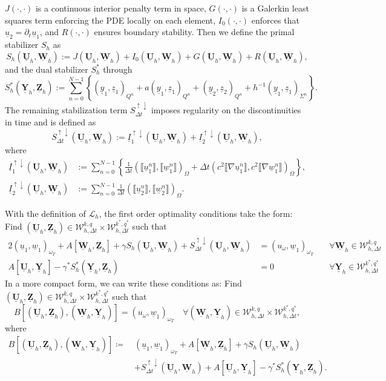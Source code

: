 \documentclass[sn-mathphys-num]{sn-jnl}
\numberwithin{equation}{section}
\newcommand{\jump}[1]{\llbracket#1\rrbracket}
\newcommand{\cL}{\mathcal{L}}
\newcommand{\ProdFullyDiscrSpace}[2]{ \mathcal{W}^{ {#1},{#2}}_{h, \Delta t  } }
\newcommand{\Uh}{\underline{\mathbf{U}}_h}
\newcommand{\Yh}{\underline{\mathbf{Y}}_h}
\newcommand{\Zh}{\underline{\mathbf{Z}}_h}
\newcommand{\Wh}{\underline{\mathbf{W}}_h}
\newcommand{\ul}{\underline{u}}
\newcommand{\yl}{\underline{y}}
\newcommand{\zl}{\underline{z}}
\newcommand{\wl}{\underline{w}}
\newcommand{\Sud}{S^{\uparrow \downarrow}_{\Delta t}}
\newcommand{\dt}{\partial_t}
\begin{document}
$J(\cdot,\cdot)$ is a continuous interior penalty term in space, $G(\cdot,\cdot)$ is a Galerkin least squares term enforcing the PDE locally on each element, $I_0(\cdot,\cdot)$ enforces that $\ul_2 = \dt \ul_1$, and $R(\cdot,\cdot)$ ensures boundary stability. 
Then we define the primal stabilizer $S_h$ as 
\begin{equation}
    S_h(\Uh,\Wh) := J(\Uh,\Wh) + I_0(\Uh,\Wh) + G(\Uh,\Wh) + R(\Uh,\Wh), 
\end{equation}
and the dual stabilizer $S_h^\ast$ through 
\begin{equation}
    S_h^\ast(\Yh,\Zh) := \sum_{n = 0}^{N-1} \left\{ (\yl_1,\zl_1)_{Q^n} + a(\yl_1,\zl_1)_{Q^n} + (\yl_2,\zl_2)_{Q^n} + h^{-1} (\yl_1,\zl_1)_{\Sigma^n} \right\}.
\end{equation}
The remaining stabilization term $\Sud$ imposes regularity on the discontinuities in time and is defined as 
\begin{equation}
    \Sud (\Uh,\Wh) := \underline{I}_1^{\uparrow \downarrow}(\Uh,\Wh) + \underline{I}_2^{\uparrow \downarrow}(\Uh,\Wh),
\end{equation}
where 
\begin{align*}
    \underline{I}_1^{\uparrow \downarrow}(\Uh,\Wh) &:= \sum_{n = 0}^{N-1} \left\{ \frac{1}{\Delta t} (\jump{\ul_1^n},\jump{\wl_1^n})_{\Omega} + \Delta t (c^2 \jump{\nabla \ul_1^n},c^2 \jump{\nabla \wl_1^n})_{\Omega}\right\}, \\
    \underline{I}_2^{\uparrow \downarrow}(\Uh,\Wh) &:= \sum_{n = 0}^{N-1} \frac{1}{\Delta t} (\jump{\ul_2^n},\jump{\wl_2^n})_{\Omega}.
\end{align*}

\noindent With the definition of $\cL_h$, the first order optimality conditions take the form: Find $(\Uh,\Zh) \in \ProdFullyDiscrSpace{k}{q} \times \ProdFullyDiscrSpace{k^\ast}{q^\ast}$ such that 
\begin{alignat*}{2}
    (\ul_1,\wl_1)_{\omega_T} \! + \! A[\Wh,\Zh] + \gamma S_h(\Uh,\Wh) + \Sud(\Uh,\Wh) &= (u_{\omega},\wl_1)_{\omega_T} \ &&\forall \Wh \in \ProdFullyDiscrSpace{k}{q} \\
    A[\Uh,\Yh] - \gamma^{\ast} S_h^\ast(\Yh,\Zh) &= 0 \ &&\forall \Yh \in \ProdFullyDiscrSpace{k^\ast}{q^\ast} 
\end{alignat*}
In a more compact form, we can write these conditions as: Find $(\Uh,\Zh) \in \ProdFullyDiscrSpace{k}{q} \times \ProdFullyDiscrSpace{k^\ast}{q^\ast}$ such that
\begin{equation}\label{eq:discreteProblem}
    B[(\Uh,\Zh),(\Wh,\Yh)] = (u_{\omega},\wl_1)_{\omega_T} \quad \forall (\Wh,\Yh) \in \ProdFullyDiscrSpace{k}{q} \times \ProdFullyDiscrSpace{k^\ast}{q^\ast},
\end{equation}
where 
\begin{equation}
    \begin{aligned}
        B[(\Uh,\Zh),(\Wh,\Yh)] \coloneqq \ &(\ul_1,\wl_1)_{\omega_T} + A[\Wh,\Zh]+ \gamma S_h(\Uh,\Wh) \\
        &+  \Sud(\Uh,\Wh) + A[\Uh,\Yh] - \gamma^{\ast} S_h^\ast(\Yh,\Zh).
    \end{aligned}
\end{equation}
\end{document}

